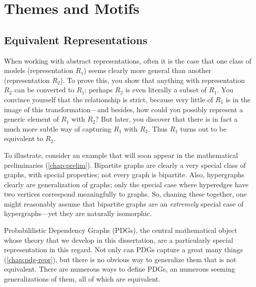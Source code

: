 

\section{}




\section{Themes and Motifs}

\subsection{Equivalent Representations}

When working with abstract representations, often it is the case that one class of models (representation $R_1$) seems clearly more general than another (representation $R_2$).
To prove this, you show that anything with representation $R_2$ can be converted to $R_1$; perhaps $R_2$ is even literally a subset of $R_1$. 
You convince yourself that the relationship is strict, because very little of $R_1$ is in the image of this transformation---and besides, how could you possibly represent a generic element of $R_1$ with $R_2$? 
But later, you discover that there is in fact a much more subtle way of capturing $R_1$ with $R_2$. 
Thus $R_1$ turns out to be equivalent to $R_2$. 

To illustrate, consider an example that will soon appear in the mathematical preliminaries (\cref{chap:prelim}). 
Bipartite graphs are clearly a very special class of graphs, with special properties; not every graph is bipartite. 
Also, hypergraphs clearly are generalization of graphs; only the special case where hyperedges have two vertices correspond meaningfully to graphs. 
So, chaning these together, one might reasonably assume that bipartite graphs are an \emph{extremely} special case of hypergraphs---yet they are naturally isomorphic. 


%
%
Probabililistic Dependency Graphs (PDGs), the central mathematical object whose theory that we develop in this dissertation, are a particularly special representation in this regard. 
Not only can PDGs capture a great many things (\cref{chap:pdg-repr}), but there is no obvious way to generalize them that is not equivalent. 
There are numerous ways to define PDGs, an numerous seeming generalizations of them, all of which are equivalent. 


